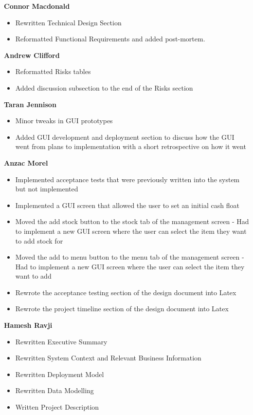\textbf{Connor Macdonald}
\begin{itemize}
	\item Rewritten Technical Design Section
	\item Reformatted Functional Requirements and added post-mortem.
\end{itemize}

\textbf{Andrew Clifford}
\begin{itemize}
	\item Reformatted Risks tables
	\item Added discussion subsection to the end of the Risks section
\end{itemize}

\textbf{Taran Jennison}
\begin{itemize}
	\item Minor tweaks in GUI prototypes
	\item Added GUI development and deployment section to discuss how the GUI went from plans to implementation with a short retrospective on how it went
\end{itemize}

\noindent\textbf{Anzac Morel}
\begin{itemize}
	\item Implemented acceptance tests that were previously written into the system but not implemented
	\item Implemented a GUI screen that allowed the user to set an initial cash float
	\item Moved the add stock button to the stock tab of the management screen - Had to implement a new GUI screen where the user can select the item they want to add stock for
	\item Moved the add to menu button to the menu tab of the management screen - Had to implement a new GUI screen where the user can select the item they want to add
	\item Rewrote the acceptance testing section of the design document into Latex
	\item Rewrote the project timeline section of the design document into Latex
\end{itemize}

\textbf{Hamesh Ravji}
\begin{itemize}
	\item Rewritten Executive Summary
	\item Rewritten System Context and Relevant Business Information
	\item Rewritten Deployment Model
	\item Rewritten Data Modelling
	\item Written Project Description
\end{itemize}

